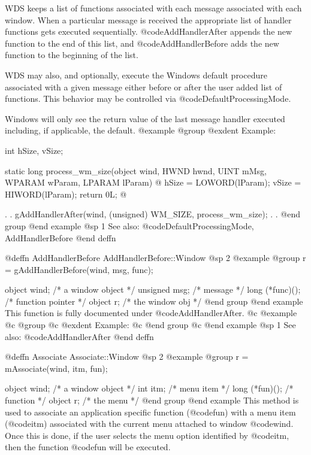WDS keeps a list of functions associated with each message associated
with each window.  When a particular message is received the appropriate
list of handler functions gets executed sequentially.
@code{AddHandlerAfter} appends the new function to the end of this list,
and @code{AddHandlerBefore} adds the new function to the beginning of
the list.

WDS may also, and optionally, execute the Windows default procedure
associated with a given message either before or after the user added
list of functions.  This behavior may be controlled via
@code{DefaultProcessingMode}.

Windows will only see the return value of the last message handler executed
including, if applicable, the default.
@example
@group
@exdent Example:

int     hSize, vSize;

static  long    process_wm_size(object  wind, 
                                HWND    hwnd, 
                                UINT    mMsg, 
                                WPARAM  wParam, 
                                LPARAM  lParam)
@{
        hSize = LOWORD(lParam);
        vSize = HIWORD(lParam);
        return 0L;
@}

        .
        .
        gAddHandlerAfter(wind, (unsigned) WM_SIZE, process_wm_size);
        .
        .
@end group
@end example
@sp 1
See also:  @code{DefaultProcessingMode, AddHandlerBefore}
@end deffn






@deffn {AddHandlerBefore} AddHandlerBefore::Window
@sp 2
@example
@group
r = gAddHandlerBefore(wind, msg, func);

object   wind;     /*  a window object  */
unsigned msg;      /*  message          */
long    (*func)(); /*  function pointer */
object  r;         /*  the window obj   */
@end group
@end example
This function is fully documented under @code{AddHandlerAfter}.
@c @example
@c @group
@c @exdent Example:
@c @end group
@c @end example
@sp 1
See also:  @code{AddHandlerAfter}
@end deffn







@deffn {Associate} Associate::Window
@sp 2
@example
@group
r = mAssociate(wind, itm, fun);

object  wind;   /*  a window object     */
int     itm;    /*  menu item           */
long    (*fun)();  /*  function         */
object   r;        /*  the menu         */
@end group
@end example
This method is used to associate an application specific function
(@code{fun}) with a menu item (@code{itm}) associated with the current
menu attached to window @code{wind}.  Once this is done, if the user selects
the menu option identified by @code{itm}, then the function @code{fun}
will be executed.

